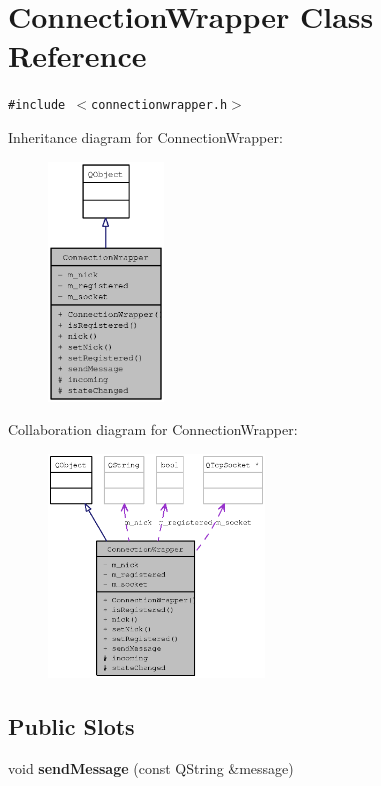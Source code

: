\section{ConnectionWrapper Class Reference}
\label{classConnectionWrapper}
{\tt \#include $<$connectionwrapper.h$>$}

Inheritance diagram for ConnectionWrapper:\nopagebreak
\begin{figure}[H]
\begin{center}
\leavevmode
\includegraphics[width=87pt]{classConnectionWrapper__inherit__graph}
\end{center}
\end{figure}
Collaboration diagram for ConnectionWrapper:\nopagebreak
\begin{figure}[H]
\begin{center}
\leavevmode
\includegraphics[width=163pt]{classConnectionWrapper__coll__graph}
\end{center}
\end{figure}
\subsection*{Public Slots}
\begin{CompactItemize}
\item 
void {\bf sendMessage} (const QString \&message)
\end{CompactItemize}
